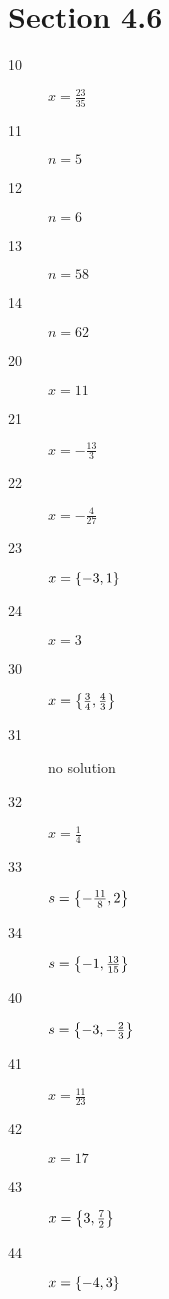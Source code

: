 \documentclass[letterpaper, landscape]{exam}
\begin{document}
    \section{Section 4.6} %
    
    \begin{description}

      \item[10] $x = \frac{23}{35}$

      \item[11] $n = 5$

      \item[12] $n = 6$

      \item[13] $n = 58$

      \item[14] $n = 62$

      \item[20] $x = 11$

      \item[21] $x = - \frac{13}{3}$

      \item[22] $x = - \frac{4}{27}$

      \item[23] $x = \cbr{ -3, 1 }$

      \item[24] $x = 3$

      \item[30] $x = \cbr{ \frac{3}{4}, \frac{4}{3} }$

      \item[31] no solution

      \item[32] $x = \frac{1}{4}$

      \item[33] $s = \cbr{ - \frac{11}{8}, 2 }$

      \item[34] $s = \cbr{ -1, \frac{13}{15} }$

      \item[40] $s = \cbr{ -3, - \frac{2}{3} }$

      \item[41] $x = \frac{11}{23}$

      \item[42] $x = 17$

      \item[43] $x = \cbr{ 3, \frac{7}{2} }$

      \item[44] $x = \cbr{ -4, 3 }$


\end{description}
\end{document}
